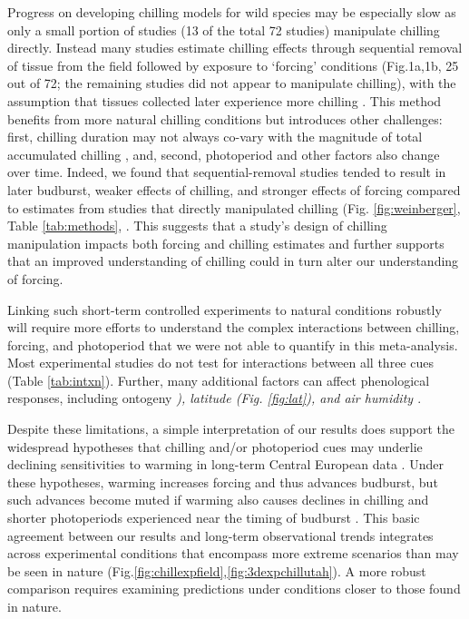 \documentclass{article}
\begin{document}
\par Progress on developing chilling models for wild species may be especially slow as only a small portion of studies (13 of the total 72 studies) manipulate chilling directly. Instead many studies estimate chilling effects through sequential removal of tissue from the field followed by exposure to `forcing' conditions (Fig.1a,1b, 25 out of 72; the remaining studies did not appear to manipulate chilling), with the assumption that tissues collected later experience more chilling \emph{\citep{weinberger1950}}. This method benefits from more natural chilling conditions but introduces other challenges: first, chilling duration may not always co-vary with the magnitude of total accumulated chilling \emph{\citep{dennis2003}}, and, second, photoperiod and other factors also change over time. Indeed, we found that sequential-removal studies tended to result in later budburst, weaker effects of chilling, and stronger effects of forcing compared to estimates from studies that directly manipulated chilling (Fig. \ref{fig:weinberger}, Table \ref{tab:methods}, \emph{\citep{weinberger1950,polgar2013}}. This suggests that a study's design of chilling manipulation impacts both forcing and chilling estimates and further supports that an improved understanding of chilling could in turn alter our understanding of forcing. 

\par Linking such short-term controlled experiments to natural conditions robustly will require more efforts to understand the complex interactions between chilling, forcing, and photoperiod that we were not able to quantify in this meta-analysis. Most experimental studies do not test for interactions between all three cues (Table \ref{tab:intxn}). Further, many additional factors can affect phenological responses, including ontogeny \emph{\citep[Table \ref{tab:stage},][]{vitasse2013ont}), latitude (Fig. \ref{fig:lat}), and air humidity \emph{\citep{Laube:2014b}}}. 
\par Despite these limitations, a simple interpretation of our results does support the widespread hypotheses that chilling and/or photoperiod cues may underlie declining sensitivities to warming in long-term Central European data \emph{\citep{fu2015,Rutishauser:2008,yu2010}}. Under these hypotheses, warming increases forcing and thus advances budburst, but such advances become muted if warming also causes declines in chilling and shorter photoperiods experienced near the timing of budburst \emph{\citep{gauzere2019}}. This basic agreement between our results and long-term observational trends integrates across experimental conditions that encompass more extreme scenarios than may be seen in nature (Fig.\ref{fig:chillexpfield},\ref{fig:3dexpchillutah}). A more robust comparison requires examining predictions under conditions closer to those found in nature.
\end{document}
